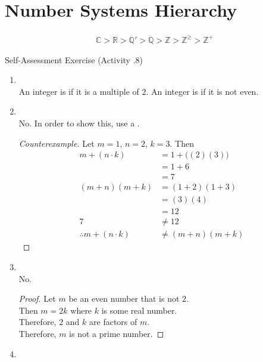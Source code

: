 \documentclass[../notes.tex]{subfiles}
\begin{document}
		\section{Number Systems Hierarchy}
			\begin{align*}
				\mathbb{C} > \mathbb{R} > \mathbb{Q}' > \mathbb{Q} > \mathbb{Z} > \mathbb{Z}^{\geq} > \mathbb{Z}^{+}
			\end{align*}
			\pagebreak
			\begin{exercise}{Self-Assessment Exercise (Activity \thechapter.8)}
				\begin{enumerate}
					\item {}\\
						An integer is  if it is a multiple of $2$. An integer is  if it is not even.
					\item {}\\
						No. In order to show this, use a .
						\begin{proof}[Counterexample]
							Let $m = 1$, $n = 2$, $k = 3$. Then
							\begin{align*}
								m + (n \cdot k) &= 1 + \bigl((2)(3)\bigr)\\
								&= 1 + 6\\
								&= 7\\
								(m + n)(m + k) &= (1 + 2)(1 + 3)\\
								&= (3)(4)\\
								&= 12\\
								7 &\neq 12\\
								\therefore m + (n \cdot k) &\neq (m + n)(m + k)
							\end{align*}
						\end{proof}
					\item {}\\
					No.
					\begin{proof}
						Let $m$ be an even number that is not $2$.\\
						Then $m = 2k$ where $k$ is some real number.\\
						Therefore, $2$ and $k$ are factors of $m$.\\
						Therefore, $m$ is not a prime number.
					\end{proof}
					\item {}\\

\end{enumerate}
\end{exercise}
\end{document}
